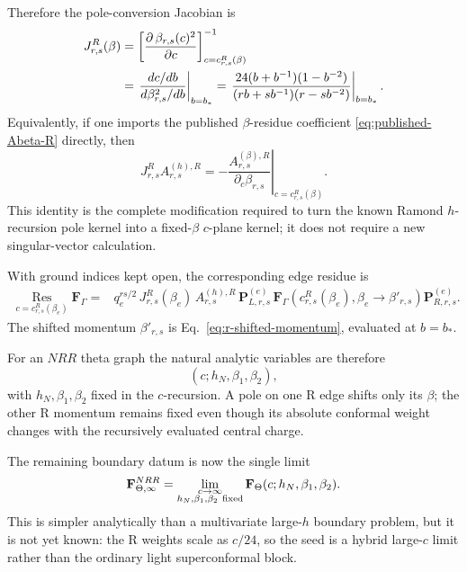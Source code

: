 \documentclass[11pt]{article}
\newcommand{\Res}{\operatorname*{Res}}
\begin{document}
Therefore the pole-conversion Jacobian is
\begin{align}
 J^R_{r,s}(\beta)
 &=
 \left[
 \frac{\partial\,\beta_{r,s}(c)^2}{\partial c}
 \right]^{-1}_{c=c^R_{r,s}(\beta)}
 \notag\\
 &=
 \left.
 \frac{dc/db}{d\beta_{r,s}^2/db}
 \right|_{b=b_*}
 =
 \left.
 \frac{
 24(b+b^{-1})(1-b^{-2})}
 {(rb+s b^{-1})(r-s b^{-2})}
 \right|_{b=b_*}.
 \label{eq:fixed-beta-jacobian}
\end{align}
Equivalently, if one imports the published \(\beta\)-residue coefficient
\eqref{eq:published-Abeta-R} directly, then
\begin{equation}
 J^R_{r,s}A^{(h),R}_{r,s}
 =
 -\left.
 \frac{A^{(\beta),R}_{r,s}}
 {\partial_c\beta_{r,s}}
 \right|_{c=c^R_{r,s}(\beta)}.
 \label{eq:published-kernel-pullback}
\end{equation}
This identity is the complete modification required to turn the known
Ramond \(h\)-recursion pole kernel into a fixed-\(\beta\) \(c\)-plane
kernel; it does not require a new singular-vector calculation.

With ground indices kept open, the corresponding edge residue is
\begin{equation}
 \begin{aligned}
 \Res_{c=c^R_{r,s}(\beta_e)}
 \mathbf F_\Gamma
 ={}&
 q_e^{rs/2}\,
 J^R_{r,s}(\beta_e)\,
 A^{(h),R}_{r,s}\,
 \mathbf P^{(e)}_{L,r,s}\,
 \mathbf F_\Gamma
 \left(
 c^R_{r,s}(\beta_e),
 \beta_e\to\beta'_{r,s}
 \right)
 \mathbf P^{(e)}_{R,r,s}.
 \end{aligned}
 \label{eq:fixed-beta-c-residue}
\end{equation}
The shifted momentum \(\beta'_{r,s}\) is
Eq.~\eqref{eq:r-shifted-momentum}, evaluated at \(b=b_*\).

For an \(NRR\) theta graph the natural analytic variables are therefore
\begin{equation}
 \left(c;h_N,\beta_1,\beta_2\right),
 \end{equation}
with \(h_N,\beta_1,\beta_2\) fixed in the \(c\)-recursion.  A pole on one R
edge shifts only its \(\beta\); the other R momentum remains fixed even
though its absolute conformal weight changes with the recursively evaluated
central charge.

The remaining boundary datum is now the single limit
\begin{equation}
 \mathbf F_{\Theta,\infty}^{NRR}
 =
 \lim_{\substack{c\to\infty\\h_N,\beta_1,\beta_2\ {\rm fixed}}}
 \mathbf F_\Theta(c;h_N,\beta_1,\beta_2).
 \label{eq:fixed-beta-large-c-seed}
\end{equation}
This is simpler analytically than a multivariate large-\(h\) boundary
problem, but it is not yet known: the R weights scale as \(c/24\), so the
seed is a hybrid large-\(c\) limit rather than the ordinary light
superconformal block.
\end{document}
